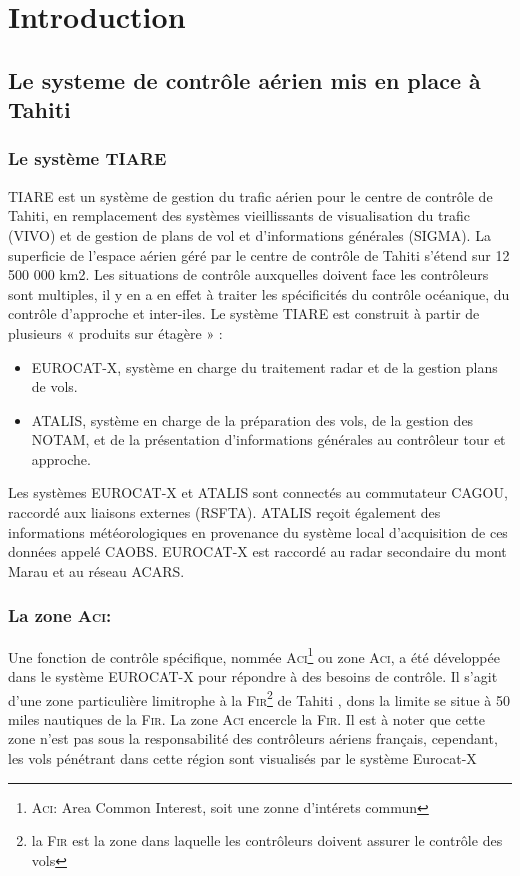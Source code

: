 
\section{Introduction}
    \subsection[Controle aérien a Thaiti]{Le systeme de contrôle aérien mis en place à Tahiti}
        \subsubsection{Le système TIARE}
TIARE est un système de gestion du trafic aérien pour le centre de contrôle de Tahiti, en remplacement des systèmes vieillissants de visualisation du trafic (VIVO) et de gestion de plans de vol et d’informations générales (SIGMA). La superficie de l'espace aérien géré par le centre de contrôle de Tahiti s’étend sur 12 500 000 km2. Les situations de contrôle auxquelles doivent face les contrôleurs sont multiples, il y en a en effet à traiter les spécificités du contrôle océanique, du contrôle d’approche et inter-iles. Le système TIARE est construit à partir de plusieurs « produits sur étagère » :
\begin{itemize}
\item EUROCAT-X, système en charge du traitement radar et de la gestion plans de vols.
\item ATALIS, système en charge de la préparation des vols, de la gestion des NOTAM, et de la présentation d’informations générales au contrôleur tour et approche.
\end{itemize}

Les systèmes EUROCAT-X et ATALIS sont connectés au commutateur CAGOU, raccordé aux liaisons externes (RSFTA). ATALIS reçoit également des informations météorologiques en provenance du système local d’acquisition de ces données appelé CAOBS. EUROCAT-X est raccordé au radar secondaire du mont Marau et au réseau ACARS.

        \subsubsection{La zone \textsc{Aci}:\label{Aci}}
Une fonction de contrôle spécifique, nommée \textsc{Aci}\footnote{\textsc{Aci}: Area Common Interest, soit une zonne d'intérets commun} ou zone \textsc{Aci}, a été développée dans le système EUROCAT-X pour répondre à des besoins de contrôle. Il s’agit d’une zone particulière limitrophe à la \textsc{Fir}\footnote{\label{FIR} la \textsc{Fir} est la zone dans laquelle les contrôleurs doivent assurer le contrôle des vols} de Tahiti , dons la limite se situe à 50 miles nautiques de la \textsc{Fir}. La zone \textsc{Aci} encercle la \textsc{Fir}. Il est à noter que cette zone n’est pas sous la responsabilité des contrôleurs aériens français, cependant, les vols pénétrant dans cette région sont visualisés par le système Eurocat-X 

